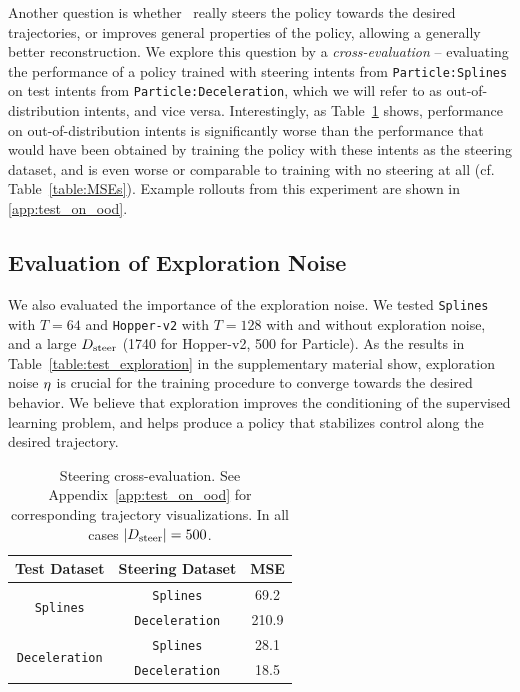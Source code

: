\documentclass[nohyperref]{article}
\begin{document}
Another question is whether \methodname\  really steers the policy towards the desired trajectories, or improves general properties of the policy, allowing a generally better reconstruction. We explore this question by a \textit{cross-evaluation} -- evaluating the performance of a policy trained with steering intents from \texttt{Particle:Splines} on test intents from \texttt{Particle:Deceleration}, which we will refer to as out-of-distribution intents, and vice versa. Interestingly, as Table~\ref{table:steering}
shows, performance on out-of-distribution intents is significantly worse than the performance that would have been obtained by training the policy with these intents as the steering dataset, and is even worse or comparable to training with no steering at all (cf. Table~\ref{table:MSEs}). Example rollouts from this experiment are shown in \ref{app:test_on_ood}.

\subsection*{Evaluation of Exploration Noise}
We also evaluated the importance of the exploration noise.
We tested \texttt{Splines} with $T=64$ and \texttt{Hopper-v2} with $T=128$ with and without exploration noise, and a large $D_{\mathrm{steer}}$ (1740 for Hopper-v2, 500 for Particle).
As the results in Table~\ref{table:test_exploration} in the supplementary material show, exploration noise $\eta$ is crucial for the training procedure to converge towards the desired behavior. 
We believe that exploration improves the conditioning of the supervised learning problem, and helps produce a policy that stabilizes control along the desired trajectory.









\begin{table}[]
    \centering
    \caption{Steering cross-evaluation. See Appendix~\ref{app:test_on_ood} for corresponding trajectory visualizations. In all cases $|D_{\mathrm{steer}}|=500$.}
    \label{table:steering}
    \begin{tabular}{ccc}
        \toprule
        Test Dataset & Steering Dataset & MSE \\
        \midrule
        \multirow{2}{*}{\texttt{Splines}}      & \texttt{Splines}      & 69.2  \\
                                               & \texttt{Deceleration} & 210.9 \\
        \midrule
        \multirow{2}{*}{\texttt{Deceleration}} & \texttt{Splines}      & 28.1  \\
                                               & \texttt{Deceleration} & 18.5  \\
        \bottomrule
    \end{tabular}
\end{table}
\end{document}
